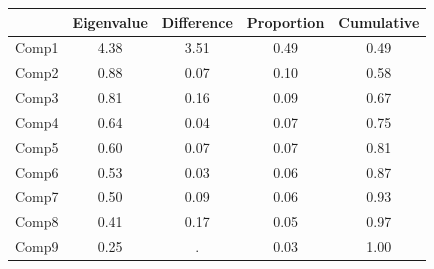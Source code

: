 {
\def\sym#1{\ifmmode^{#1}\else\(^{#1}\)\fi}
\begin{tabular}{l*{1}{cccc}}
\toprule
            &  Eigenvalue&  Difference&  Proportion&  Cumulative\\
\midrule
Comp1       &        4.38&        3.51&        0.49&        0.49\\
Comp2       &        0.88&        0.07&        0.10&        0.58\\
Comp3       &        0.81&        0.16&        0.09&        0.67\\
Comp4       &        0.64&        0.04&        0.07&        0.75\\
Comp5       &        0.60&        0.07&        0.07&        0.81\\
Comp6       &        0.53&        0.03&        0.06&        0.87\\
Comp7       &        0.50&        0.09&        0.06&        0.93\\
Comp8       &        0.41&        0.17&        0.05&        0.97\\
Comp9       &        0.25&           .&        0.03&        1.00\\
\bottomrule
\end{tabular}
}
